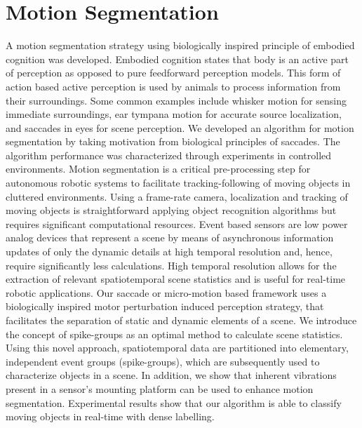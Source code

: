  \section{Motion Segmentation }
 A motion segmentation strategy using biologically inspired principle of embodied cognition was developed. Embodied cognition states that body is an active part of perception as opposed to pure feedforward perception models. This form of action based active perception is used by animals to process information from their surroundings. Some common examples include whisker motion for sensing immediate surroundings, ear tympana motion for accurate source localization, and saccades in eyes for scene perception. We developed an algorithm for motion segmentation by taking motivation from biological principles of saccades. The algorithm performance was characterized through experiments in controlled environments.
Motion segmentation is a critical pre-processing step for autonomous robotic systems to facilitate tracking-following of moving objects in cluttered environments. Using a frame-rate camera, localization and tracking of moving objects is straightforward applying object recognition algorithms but requires significant computational resources. Event based sensors are low power analog devices that represent a scene by means of asynchronous information updates of only the dynamic details at high temporal resolution and, hence, require significantly less calculations. High temporal resolution allows for the extraction of relevant spatiotemporal scene statistics and is useful for real-time robotic applications. Our saccade or micro-motion based framework uses a biologically inspired motor perturbation induced perception strategy, that facilitates the separation of static and dynamic elements of a scene. We introduce the concept of spike-groups as an optimal method to calculate scene statistics. Using this novel approach, spatiotemporal data are partitioned into elementary, independent event groups (spike-groups), which are subsequently used to characterize objects in a scene. In addition, we show that inherent vibrations present in a sensor’s mounting platform can be used to enhance motion segmentation. Experimental results show that our algorithm is able to classify moving objects in real-time with dense labelling.


